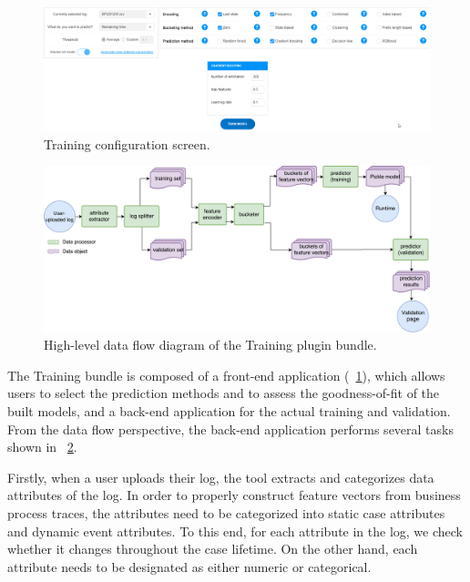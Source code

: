 \documentclass[runningheads,a4paper]{llncs}
\begin{document}
\begin{figure}[t!]%
	\centering
	 \includegraphics[width=\textwidth]{img/nirdizati-frontend2}
	\caption{Training configuration screen.}
	\label{fig:nirdizati-frontend}
	\vspace{-0.5\baselineskip}
\end{figure}
\begin{figure}[b!]%
	\centering
	 \includegraphics[width=\textwidth]{img/training-dataflow}
	\caption{High-level data flow diagram of the Training plugin bundle.}
	\label{fig:nirdizati-training}
	\end{figure}
The Training bundle is composed of a front-end application (\figurename~\ref{fig:nirdizati-frontend}), which allows users to select the prediction methods
and to assess the goodness-of-fit of the built models, and a back-end application  for the actual training and validation. From the data flow perspective, the back-end application performs several tasks shown in \figurename~\ref{fig:nirdizati-training}.

Firstly, when a user uploads their log, the tool extracts and categorizes data attributes of the log. In order to properly construct feature vectors from business process traces, the attributes need to be categorized into static case attributes and dynamic event attributes. To this end, for each attribute in the log, we check whether it changes throughout the case lifetime. On the other hand, each attribute needs to be designated as either numeric or categorical. 
\end{document}
